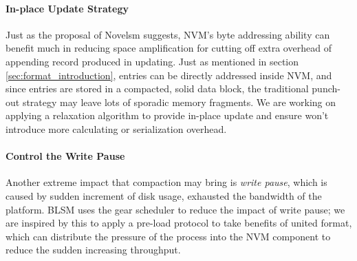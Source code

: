 \paragraph{In-place Update Strategy}
Just as the proposal of Novelsm\cite{kannan2018redesigning} suggests, NVM's byte addressing ability can benefit much in reducing space amplification for cutting off extra overhead of appending record produced in updating. Just as mentioned in section \ref{sec:format_introduction}, entries can be directly addressed inside NVM, and since entries are stored in a compacted, solid data block, the traditional punch-out strategy may leave lots of sporadic memory fragments. We are working on applying a relaxation algorithm to provide in-place update and ensure won't introduce more calculating or serialization overhead.

\paragraph{Control the Write Pause}
Another extreme impact that compaction may bring is \textit{write pause}, which is caused by sudden increment of disk usage, exhausted the bandwidth of the platform. BLSM uses the gear scheduler to reduce the impact of write pause; we are inspired by this to apply a pre-load protocol to take benefits of united format, which can distribute the pressure of the process into the NVM component to reduce the sudden increasing throughput.






